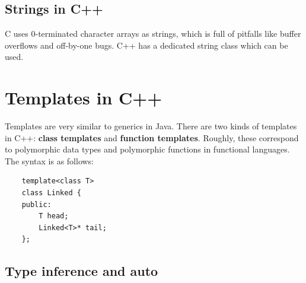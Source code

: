 \documentclass{article}
\begin{document}
	\subsection{Strings in C++}
	C uses 0-terminated character arrays as strings, which is full of pitfalls like buffer overflows and off-by-one bugs. C++ has a dedicated string class which can be used.
	 
	\section{Templates in C++}
	Templates are very similar to generics in Java. There are two kinds of templates in C++: \textbf{class templates} and \textbf{function templates}. Roughly, these correspond to polymorphic data types and polymorphic functions in functional languages. The syntax is as follows:
	
	\begin{verbatim}
	template<class T>
	class Linked {
	public:
	    T head;
	    Linked<T>* tail;
	};
	\end{verbatim}
	
	\subsection{Type inference and auto}
		
	\newpage
	\listoffigures
	\printindex
\end{document}
